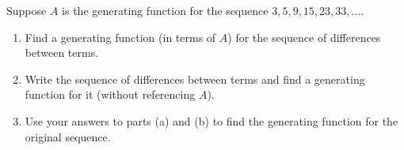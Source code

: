 \documentclass[10pt,]{book}
\theoremstyle{plain}
\theoremstyle{definition}
\theoremstyle{definition}
\theoremstyle{definition}
\theoremstyle{definition}
\numberwithin{equation}{chapter}
\begin{document}
\begin{divisionexercise}{16}\hypertarget{exercise-99}{}
\hypertarget{p-1050}{}%
Suppose \(A\) is the generating function for the sequence \(3, 5, 9, 15, 23, 33, \ldots\).%
\par
\hypertarget{p-1051}{}%
\leavevmode%
\begin{enumerate}[label=(\alph*)]
\item\hypertarget{li-206}{}\hypertarget{p-1052}{}%
Find a generating function (in terms of \(A\)) for the sequence of differences between terms.%
\item\hypertarget{li-207}{}\hypertarget{p-1053}{}%
Write the sequence of differences between terms and find a generating function for it (without referencing \(A\)).%
\item\hypertarget{li-208}{}\hypertarget{p-1054}{}%
Use your answers to parts (a) and (b) to find the generating function for the original sequence.%
\end{enumerate}
%
\end{divisionexercise}%
\typeout{************************************************}
\typeout{************************************************}
\end{document}
